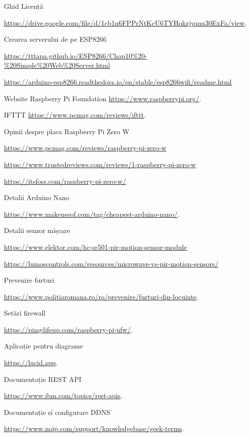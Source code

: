\begin{thebibliography}{64}
	
	Ghid Licență 
	
	\url{https://drive.google.com/file/d/1cb1n6FPPrNtKcU6TYHokzjvanu30ExFa/view}.
	
	Crearea serverului de pe ESP8266
	
	\url{https://tttapa.github.io/ESP8266/Chap10%20-%20Simple%20Web%20Server.html}
	
	\url{https://arduino-esp8266.readthedocs.io/en/stable/esp8266wifi/readme.html}
	
	Website Raspberry Pi Foundation \url{https://www.raspberrypi.org/}.
	
	IFTTT \url{https://www.pcmag.com/reviews/ifttt}.
	
	Opinii despre placa Raspberry Pi Zero W 
	
	\url{https://www.pcmag.com/reviews/raspberry-pi-zero-w}
	
	\url{https://www.trustedreviews.com/reviews/1-raspberry-pi-zero-w}
	
	\url{https://itsfoss.com/raspberry-pi-zero-w/}
	
	Detalii Arduino Nano
	 
	\url{https://www.makeuseof.com/tag/cheapest-arduino-nano/}.
	
	Detalii senzor mișcare
	
	\url{https://www.elektor.com/hc-sr501-pir-motion-sensor-module}
	
	\url{https://lumoscontrols.com/resources/microwave-vs-pir-motion-sensors/}
	
	Prevenire furturi
	
	\url{https://www.politiaromana.ro/ro/prevenire/furturi-din-locuinte}.
	
	Setări firewall
	
	\url{https://pimylifeup.com/raspberry-pi-ufw/}.
	
	Aplicație pentru diagrame
	
	\url{https://lucid.app}.
	
	Documentație REST API
	
	\url{https://www.ibm.com/topics/rest-apis}.
	
	Documentație și configurare DDNS
	
	\url{https://www.noip.com/support/knowledgebase/geek-terms}.
	

\end{thebibliography}
